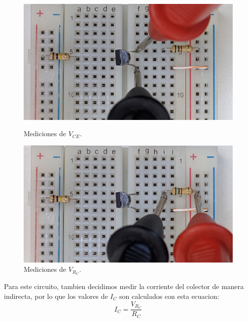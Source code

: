     \begin{figure}[!ht]
      \centering
      \begin{minipage}{0.49\textwidth}
        \includegraphics[width=1\textwidth]{pictures/prot_crkt-3_Vce.jpg}
        \caption{Mediciones de $V_{CE}$.}
      \end{minipage}
      \begin{minipage}{0.49\textwidth}
        \includegraphics[width=1\textwidth]{pictures/prot_crkt-3_Vrc.jpg}
        \caption{Mediciones de $V_{R_C}$.}
      \end{minipage}
    \end{figure}

      Para este circuito, tambien decidimos medir la corriente del colector de manera indirecta, por lo que los valores
      de $I_C$ son calculados con esta ecuacion:
      \begin{equation}
        I_C = \frac{V_{R_C}}{R_C}
      \end{equation}

